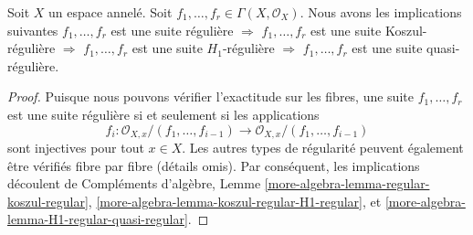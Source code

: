 \begin{lemma}
\label{lemma-types-regular-sequences-implications}
Soit  $X$  un espace annelé. Soit  $f_1, \ldots, f_r \in \Gamma(X, \mathcal{O}_X)$. Nous avons les implications
suivantes  $f_1, \ldots, f_r$  est une suite régulière  $\Rightarrow$   $f_1, \ldots, f_r$  est une
suite Koszul-régulière  $\Rightarrow$   $f_1, \ldots, f_r$  est une suite
 $H_1$-régulière  $\Rightarrow$   $f_1, \ldots, f_r$  est une suite quasi-régulière.
\end{lemma}

\begin{proof}
Puisque nous pouvons vérifier l'exactitude sur les fibres, une suite  $f_1, \ldots, f_r$ 
est une suite régulière si et seulement si les applications
$$
f_i :
\mathcal{O}_{X, x}/(f_1, \ldots, f_{i - 1})
\longrightarrow
\mathcal{O}_{X, x}/(f_1, \ldots, f_{i - 1})
$$
sont injectives pour tout  $x \in X$. Les autres types de régularité peuvent
également être vérifiés fibre par fibre (détails omis). Par conséquent, les
implications découlent de Compléments d'algèbre, Lemme  \ref{more-algebra-lemma-regular-koszul-regular},  \ref{more-algebra-lemma-koszul-regular-H1-regular}, et
 \ref{more-algebra-lemma-H1-regular-quasi-regular}.
\end{proof}


